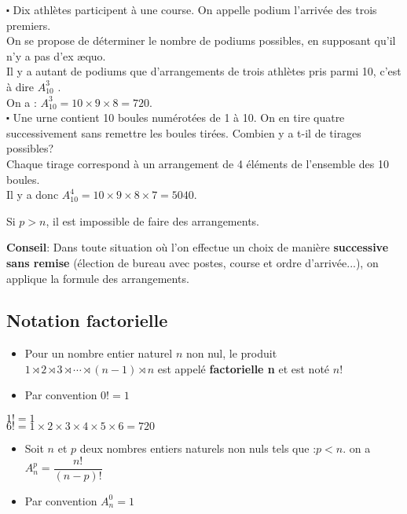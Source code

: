 \begin{example}
$ \centerdot  $  Dix athlètes participent à une course. On appelle podium l'arrivée des trois premiers.\\
On se propose de déterminer  le nombre de podiums possibles, en supposant qu'il n'y a pas d'ex æquo.\\
Il y a autant de podiums  que d'arrangements de trois athlètes pris parmi 10, c'est à dire $ A_{10}^{3} $ . \\On a : 
$A_{10}^{3} =10\times 9\times 8=720.  $\\

$ \centerdot $ Une urne contient 10 boules numérotées de 1 à 10. On en tire quatre successivement sans  remettre  les boules tirées.  Combien y a t-il de tirages  possibles? \\
Chaque tirage correspond à un arrangement de 4 éléments de l'ensemble des 10 boules.\\
Il y a donc $A_{10}^{4} =10\times 9\times 8 \times 7 =5040.  $
\end{example}
\begin{remark}
Si $  p > n $, il est impossible de faire des arrangements.
\end{remark}
\textbf{Conseil}: Dans toute situation  où l'on effectue un choix de manière \textbf{successive sans remise} (élection de bureau avec postes, course et ordre d'arrivée...), on applique la formule des arrangements.
\subsection*{Notation factorielle}
\begin{itemize}
\item  Pour un nombre  entier naturel $ n $ non nul, le produit $ 1\rtimes 2\rtimes 3\rtimes \cdots \rtimes (n-1)\rtimes n  $ est appelé \textbf{factorielle n} et est noté $n!$\\
\item  Par convention $ 0!=1 $
\end{itemize}
\begin{example}
$1!=1$\\
$6!=1\times 2\times 3\times 4\times 5 \times 6= 720$
\end{example}
\begin{property}
\begin{itemize}
\item  Soit $ n$ et $p $ deux  nombres  entiers naturels  non nuls tels que :$ p< n $. on a  $A_{n}^{p}= \dfrac{n!}{(n-p)!} $
\item  Par convention $ A_{n}^{0}=1 $
\end{itemize}
\end{property}
